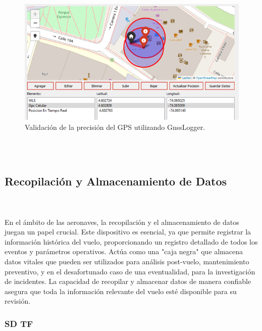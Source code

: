 \begin{figure}[H]
    \centering
    \includegraphics[width=10 cm]{Imagenes/Firmware/GPS.png}
    \caption{Validación de la precisión del GPS utilizando GnssLogger.}
    \label{fig:gpsGnss}
\end{figure}




\\ \\
\subsection{Recopilación y Almacenamiento de Datos}
\\ \\
En el ámbito de las aeronaves, la recopilación y el almacenamiento de datos juegan un papel crucial. Este dispositivo es esencial, ya que permite registrar la información histórica del vuelo, proporcionando un registro detallado de todos los eventos y parámetros operativos. Actúa como una "caja negra" que almacena datos vitales que pueden ser utilizados para análisis post-vuelo, mantenimiento preventivo, y en el desafortunado caso de una eventualidad, para la investigación de incidentes. La capacidad de recopilar y almacenar datos de manera confiable asegura que toda la información relevante del vuelo esté disponible para su revisión.
\subsubsection{SD TF}

